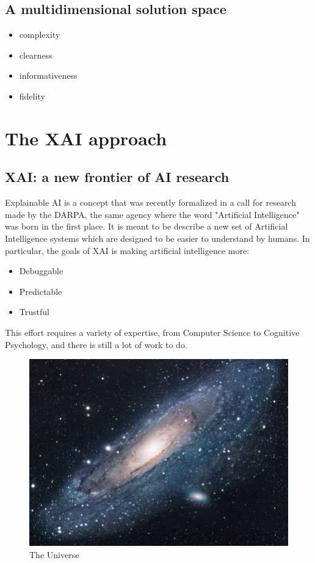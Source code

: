\documentclass[conference]{IEEEtran}
\newcommand{\note}{\todo[]}
\begin{document}
\subsection{A multidimensional solution space}

\begin{itemize}
    \item complexity
    \item clearness
    \item informativeness
    \item fidelity
\end{itemize}

\section{The XAI approach}
\label{sec:xai}

\subsection{XAI: a new frontier of AI research}

Explainable AI is a concept that was recently formalized in a call for research
\note{cit} made by the DARPA, the same agency where the word "Artificial
Intelligence" was born in the first place. It is meant to be describe a new set
of Artificial Intelligence systems which are designed to be easier to understand
by humans. In particular, the goals of XAI is making artificial intelligence
more:

\begin{itemize}
    \item Debuggable
    \item Predictable
    \item Trustful
\end{itemize}


This effort requires a variety of expertise, from Computer Science to Cognitive
Psychology, and there is still a lot of work to do.

\begin{figure}[h!] \centering \includegraphics[scale=1.7]{images/universe}
    \caption{The Universe} \label{fig:universe} \end{figure}
\end{document}
